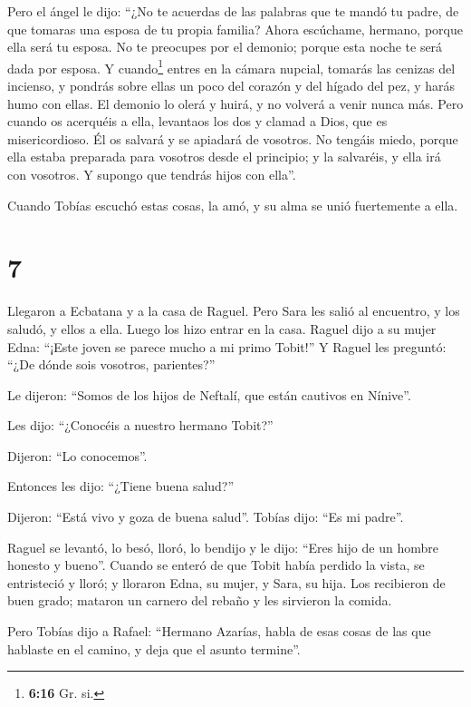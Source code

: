  Pero el ángel le dijo: ``¿No te acuerdas de las palabras
que te mandó tu padre, de que tomaras una esposa de tu propia familia?
Ahora escúchame, hermano, porque ella será tu esposa. No te preocupes
por el demonio; porque esta noche te será dada por esposa.
 Y cuando\footnote{\textbf{6:16} Gr. si.} entres en la
cámara nupcial, tomarás las cenizas del incienso, y pondrás sobre ellas
un poco del corazón y del hígado del pez, y harás humo con ellas.
 El demonio lo olerá y huirá, y no volverá a venir nunca
más. Pero cuando os acerquéis a ella, levantaos los dos y clamad a Dios,
que es misericordioso. Él os salvará y se apiadará de vosotros. No
tengáis miedo, porque ella estaba preparada para vosotros desde el
principio; y la salvaréis, y ella irá con vosotros. Y supongo que
tendrás hijos con ella''.

Cuando Tobías escuchó estas cosas, la amó, y su alma se unió fuertemente
a ella.

\hypertarget{section-6}{%
\section{7}\label{section-6}}

 Llegaron a Ecbatana y a la casa de Raguel. Pero Sara les
salió al encuentro, y los saludó, y ellos a ella. Luego los hizo entrar
en la casa.  Raguel dijo a su mujer Edna: ``¡Este joven se
parece mucho a mi primo Tobit!''  Y Raguel les preguntó:
``¿De dónde sois vosotros, parientes?''

Le dijeron: ``Somos de los hijos de Neftalí, que están cautivos en
Nínive''.

 Les dijo: ``¿Conocéis a nuestro hermano Tobit?''

Dijeron: ``Lo conocemos''.

Entonces les dijo: ``¿Tiene buena salud?''

 Dijeron: ``Está vivo y goza de buena salud''. Tobías
dijo: ``Es mi padre''.

 Raguel se levantó, lo besó, lloró,  lo
bendijo y le dijo: ``Eres hijo de un hombre honesto y bueno''. Cuando se
enteró de que Tobit había perdido la vista, se entristeció y lloró;
 y lloraron Edna, su mujer, y Sara, su hija. Los
recibieron de buen grado; mataron un carnero del rebaño y les sirvieron
la comida.

Pero Tobías dijo a Rafael: ``Hermano Azarías, habla de esas cosas de las
que hablaste en el camino, y deja que el asunto termine''.

